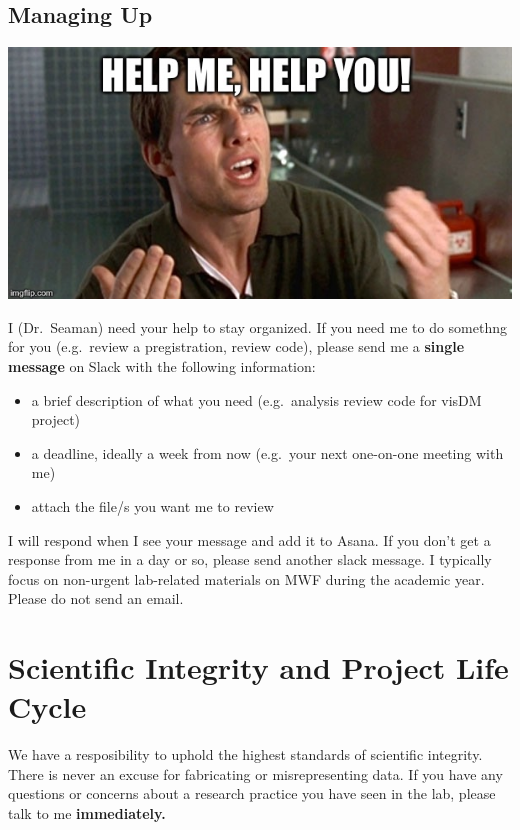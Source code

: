 \documentclass[]{book}
\begin{document}
\hypertarget{managing-up}{%
\section{Managing Up}\label{managing-up}}

\includegraphics{images/helpme.jpeg}

I (Dr.~Seaman) need your help to stay organized. If you need me to do somethng for you (e.g.~review a pregistration, review code), please send me a \textbf{single message} on Slack with the following information:

\begin{itemize}
\item
  a brief description of what you need (e.g.~analysis review code for visDM project)
\item
  a deadline, ideally a week from now (e.g.~your next one-on-one meeting with me)
\item
  attach the file/s you want me to review
\end{itemize}

I will respond when I see your message and add it to Asana. If you don't get a response from me in a day or so, please send another slack message. I typically focus on non-urgent lab-related materials on MWF during the academic year. Please do not send an email.

\hypertarget{scientific-integrity-and-project-life-cycle}{%
\chapter{Scientific Integrity and Project Life Cycle}\label{scientific-integrity-and-project-life-cycle}}

We have a resposibility to uphold the highest standards of scientific integrity. There is never an excuse for fabricating or misrepresenting data. If you have any questions or concerns about a research practice you have seen in the lab, please talk to me \textbf{immediately.}
\end{document}

